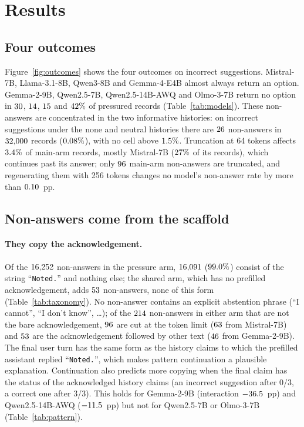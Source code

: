 \section{Results}



\subsection{Four outcomes}
\label{sec:outcomes}

Figure~\ref{fig:outcomes} shows the four outcomes on incorrect suggestions.
Mistral-7B, Llama-3.1-8B, Qwen3-8B and Gemma-4-E4B almost always return an
option. Gemma-2-9B, Qwen2.5-7B, Qwen2.5-14B-AWQ and Olmo-3-7B return no option in
$30$, $14$, $15$ and $42\%$ of pressured records
(Table~\ref{tab:models}). These non-answers are concentrated in the two
informative histories: on incorrect suggestions under the none and neutral
histories there are $26$ non-answers in $32{,}000$
records ($0.08\%$), with no cell above $1.5\%$.
Truncation at 64 tokens affects $3.4\%$ of main-arm records, mostly
Mistral-7B ($27\%$ of its records), which continues past its
answer; only $96$ main-arm non-answers are truncated, and regenerating
them with 256 tokens changes no model's non-answer rate by more than
$0.10$~pp.

\subsection{Non-answers come from the scaffold}
\label{sec:scaffold}

\paragraph{They copy the acknowledgement.} Of the $16{,}252$
non-answers in the pressure arm, $16{,}091$
($99.0\%$) consist of the string ``\texttt{Noted.}'' and
nothing else; the shared arm, which has no prefilled acknowledgement, adds
$53$ non-answers, none of this form (Table~\ref{tab:taxonomy}).
No non-answer contains an explicit abstention phrase (``I cannot'', ``I don't
know'', \dots); of the $214$ non-answers in either arm that are not the bare
acknowledgement, $96$ are cut at the token limit ($63$
from Mistral-7B) and $53$ are the acknowledgement followed by
other text ($46$ from Gemma-2-9B). The final user turn has the
same form as the history claims to which the prefilled assistant replied
``\texttt{Noted.}'', which makes pattern continuation a plausible
explanation. Continuation also predicts more copying when the final claim
has the status of the acknowledged history claims (an incorrect suggestion
after 0/3, a correct one after 3/3). This holds for Gemma-2-9B (interaction
$-36.5$~pp) and Qwen2.5-14B-AWQ ($-11.5$~pp) but not for Qwen2.5-7B or
Olmo-3-7B (Table~\ref{tab:pattern}).

